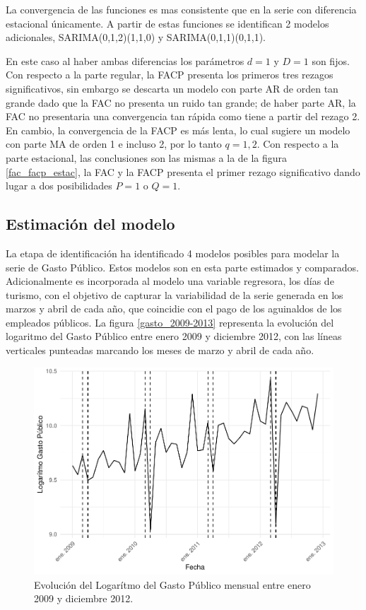 \documentclass[
  12pt,
]{article}
\begin{document}
La convergencia de las funciones es mas consistente que en la serie con
diferencia estacional únicamente. A partir de estas funciones se
identifican 2 modelos adicionales, SARIMA(0,1,2)(1,1,0) y
SARIMA(0,1,1)(0,1,1).

En este caso al haber ambas diferencias los parámetros \(d=1\) y \(D=1\)
son fijos. Con respecto a la parte regular, la FACP presenta los
primeros tres rezagos significativos, sin embargo se descarta un modelo
con parte AR de orden tan grande dado que la FAC no presenta un ruido
tan grande; de haber parte AR, la FAC no presentaria una convergencia
tan rápida como tiene a partir del rezago 2. En cambio, la convergencia
de la FACP es más lenta, lo cual sugiere un modelo con parte MA de orden
1 e incluso 2, por lo tanto \(q={1,2}\). Con respecto a la parte
estacional, las conclusiones son las mismas a la de la figura
\ref{fac_facp_estac}, la FAC y la FACP presenta el primer rezago
significativo dando lugar a dos posibilidades \(P=1\) o \(Q=1\).

\hypertarget{estimaciuxf3n-del-modelo}{%
\subsection{Estimación del modelo}\label{estimaciuxf3n-del-modelo}}

La etapa de identificación ha identificado 4 modelos posibles para
modelar la serie de Gasto Público. Estos modelos son en esta parte
estimados y comparados. Adicionalmente es incorporada al modelo una
variable regresora, los días de turismo, con el objetivo de capturar la
variabilidad de la serie generada en los marzos y abril de cada año, que
coincidie con el pago de los aguinaldos de los empleados públicos. La
figura \ref{gasto_2009-2013} representa la evolución del logaritmo del
Gasto Público entre enero 2009 y diciembre 2012, con las líneas
verticales punteadas marcando los meses de marzo y abril de cada año.

\begin{figure}[H]

{\centering \includegraphics[width=0.85\linewidth]{informe_files/figure-latex/gasto_2009-2012-1} 

}

\caption{\label{gasto_2009-2013} Evolución del Logarítmo del Gasto Público mensual entre enero 2009 y diciembre 2012.}\label{fig:gasto_2009-2012}
\end{figure}
\end{document}
